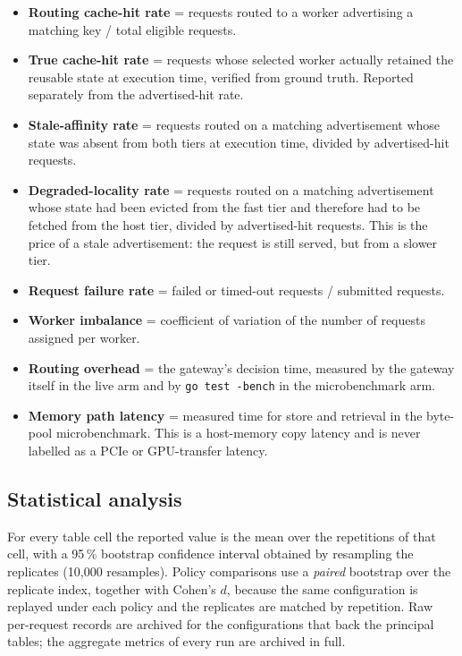 \documentclass[10pt,twocolumn]{article}
\begin{document}
\begin{itemize}
\item \textbf{Routing cache-hit rate} = requests routed to a worker
advertising a matching key / total eligible requests.
\item \textbf{True cache-hit rate} = requests whose selected worker actually
retained the reusable state at execution time, verified from ground truth.
Reported separately from the advertised-hit rate.
\item \textbf{Stale-affinity rate} = requests routed on a matching
advertisement whose state was absent from both tiers at execution time,
divided by advertised-hit requests.
\item \textbf{Degraded-locality rate} = requests routed on a matching
advertisement whose state had been evicted from the fast tier and therefore
had to be fetched from the host tier, divided by advertised-hit requests.
This is the price of a stale advertisement: the request is still served, but
from a slower tier.
\item \textbf{Request failure rate} = failed or timed-out requests / submitted
requests.
\item \textbf{Worker imbalance} = coefficient of variation of the number of
requests assigned per worker.
\item \textbf{Routing overhead} = the gateway's decision time, measured by the
gateway itself in the live arm and by \texttt{go test -bench} in the
microbenchmark arm.
\item \textbf{Memory path latency} = measured time for store and retrieval in
the byte-pool microbenchmark. This is a host-memory copy latency and is never
labelled as a PCIe or GPU-transfer latency.
\end{itemize}

\subsection{Statistical analysis}

For every table cell the reported value is the mean over the repetitions of
that cell, with a 95\,\% bootstrap confidence interval obtained by
resampling the replicates (10{,}000 resamples). Policy comparisons use a
\emph{paired} bootstrap over the replicate index, together with Cohen's
$d$, because the same configuration is replayed under each policy and the
replicates are matched by repetition. Raw per-request records are archived for
the configurations that back the principal tables; the aggregate metrics of
every run are archived in full.
\end{document}
